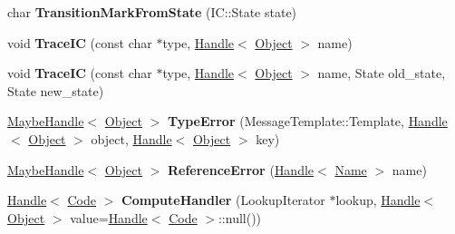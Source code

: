 \begin{DoxyCompactItemize}
\item 
char {\bfseries Transition\+Mark\+From\+State} (I\+C\+::\+State state)\hypertarget{classv8_1_1internal_1_1_i_c_ac4072f911634765d5b5777c71b9dd68a}{}\label{classv8_1_1internal_1_1_i_c_ac4072f911634765d5b5777c71b9dd68a}

\item 
void {\bfseries Trace\+IC} (const char $\ast$type, \hyperlink{classv8_1_1internal_1_1_handle}{Handle}$<$ \hyperlink{classv8_1_1internal_1_1_object}{Object} $>$ name)\hypertarget{classv8_1_1internal_1_1_i_c_af37837a5140c88c3179a970e690e091e}{}\label{classv8_1_1internal_1_1_i_c_af37837a5140c88c3179a970e690e091e}

\item 
void {\bfseries Trace\+IC} (const char $\ast$type, \hyperlink{classv8_1_1internal_1_1_handle}{Handle}$<$ \hyperlink{classv8_1_1internal_1_1_object}{Object} $>$ name, State old\+\_\+state, State new\+\_\+state)\hypertarget{classv8_1_1internal_1_1_i_c_a8576e14981ac1ce2ae476299799eb694}{}\label{classv8_1_1internal_1_1_i_c_a8576e14981ac1ce2ae476299799eb694}

\item 
\hyperlink{classv8_1_1internal_1_1_maybe_handle}{Maybe\+Handle}$<$ \hyperlink{classv8_1_1internal_1_1_object}{Object} $>$ {\bfseries Type\+Error} (Message\+Template\+::\+Template, \hyperlink{classv8_1_1internal_1_1_handle}{Handle}$<$ \hyperlink{classv8_1_1internal_1_1_object}{Object} $>$ object, \hyperlink{classv8_1_1internal_1_1_handle}{Handle}$<$ \hyperlink{classv8_1_1internal_1_1_object}{Object} $>$ key)\hypertarget{classv8_1_1internal_1_1_i_c_a459f5ce45a9a216b4d6290a1d1dcb085}{}\label{classv8_1_1internal_1_1_i_c_a459f5ce45a9a216b4d6290a1d1dcb085}

\item 
\hyperlink{classv8_1_1internal_1_1_maybe_handle}{Maybe\+Handle}$<$ \hyperlink{classv8_1_1internal_1_1_object}{Object} $>$ {\bfseries Reference\+Error} (\hyperlink{classv8_1_1internal_1_1_handle}{Handle}$<$ \hyperlink{classv8_1_1internal_1_1_name}{Name} $>$ name)\hypertarget{classv8_1_1internal_1_1_i_c_ae78e3ad7c18effdc35a4b307d497ad6d}{}\label{classv8_1_1internal_1_1_i_c_ae78e3ad7c18effdc35a4b307d497ad6d}

\item 
\hyperlink{classv8_1_1internal_1_1_handle}{Handle}$<$ \hyperlink{classv8_1_1internal_1_1_code}{Code} $>$ {\bfseries Compute\+Handler} (Lookup\+Iterator $\ast$lookup, \hyperlink{classv8_1_1internal_1_1_handle}{Handle}$<$ \hyperlink{classv8_1_1internal_1_1_object}{Object} $>$ value=\hyperlink{classv8_1_1internal_1_1_handle}{Handle}$<$ \hyperlink{classv8_1_1internal_1_1_code}{Code} $>$\+::null())\hypertarget{classv8_1_1internal_1_1_i_c_afeb14717ac60407b2f5769b37a21843d}{}\label{classv8_1_1internal_1_1_i_c_afeb14717ac60407b2f5769b37a21843d}


\end{DoxyCompactItemize}
